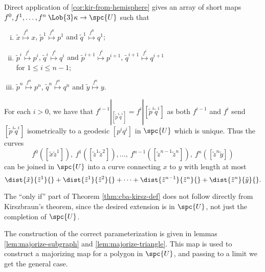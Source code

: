  Direct application of \ref{cor:kir-from-hemisphere} 
gives an array of short maps $f^0,f^1,\dots,f^n\:\Lob{3}\kappa\to \spc{U}$ such that
\begin{enumerate}[(i)]

\item $\tilde x\stackrel{f^0}{\longmapsto} x$, 
$\tilde p^1\stackrel{f^0}{\longmapsto} p^1$ and 
$\tilde q^1\stackrel{f^0}{\longmapsto}q^1$;

\item 
$\tilde p^i      \stackrel{f^i}{\longmapsto} p^i$, 
$\tilde q^{i}    \stackrel{f^i}{\longmapsto} q^i$ and 
$\tilde p^{i+1}  \stackrel{f^i}{\longmapsto} p^{i+1}$, 
$\tilde q^{i+1}  \stackrel{f^i}{\longmapsto} q^{i+1}$\\ 
for $1\le i\le n-1$;
\item 
$\tilde p^n\stackrel{f^n}{\longmapsto} p^n$,
$\tilde q^n\stackrel{f^n}{\longmapsto}q^n$ and $\tilde y\stackrel{f^n}{\longmapsto} y$.
\end{enumerate}
For each $i>0$, we have that $f^{i-1}|_{[\tilde p^i\tilde q^i]}=f^{i}|[\tilde p^i\tilde q^i]$ as 
both $f^{i-1}$ and $f^{i}$ send $[\tilde p^i\tilde q^i]$ isometrically to a geodesic $[p^i q^i]$ in $\spc{U}$ which is unique.
Thus the curves
\[f^0([\tilde x\tilde z^1]),\ f^1([\tilde z^1\tilde z^2]),\dots,\ f^{n-1}([\tilde z^{n-1}\tilde z^n]),\ f^n([\tilde z^n\tilde y])\]
can be joined in $\spc{U}$ into a curve connecting $x$ to $y$ with length at most 
\[\dist{\tilde x}{\tilde z^1}{}+\dist{\tilde z^1}{\tilde z^2}{}+\dots+\dist{\tilde z^{n-1}}{\tilde z^n}{}+\dist{\tilde z^n}{\tilde y}{}.\]
\qedsf












The ``only if'' part of Theorem \ref{thm:cba-kirsz-def} does not follow directly from Kirszbraun's theorem, since the desired extension is in $\spc{U}$, not just the completion of $\spc{U}$.












The construction of the correct parameterization is given in lemmas \ref{lem:majorize-subgraph} and \ref{lem:majorize-triangle}.
This map is used to construct a  majorizing map for a polygon in $\spc{U}$, and passing to a limit we get the general case. 

